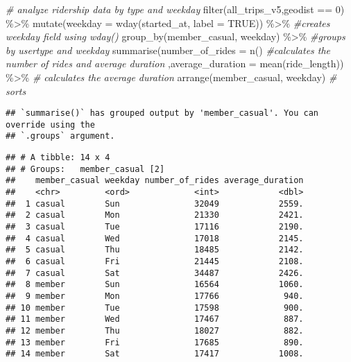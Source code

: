 \documentclass[
]{article}
\newenvironment{Shaded}{\begin{snugshade}}{\end{snugshade}}
\newcommand{\AttributeTok}[1]{\textcolor[rgb]{0.77,0.63,0.00}{#1}}
\newcommand{\CommentTok}[1]{\textcolor[rgb]{0.56,0.35,0.01}{\textit{#1}}}
\newcommand{\ConstantTok}[1]{\textcolor[rgb]{0.00,0.00,0.00}{#1}}
\newcommand{\DecValTok}[1]{\textcolor[rgb]{0.00,0.00,0.81}{#1}}
\newcommand{\FunctionTok}[1]{\textcolor[rgb]{0.00,0.00,0.00}{#1}}
\newcommand{\NormalTok}[1]{#1}
\newcommand{\SpecialCharTok}[1]{\textcolor[rgb]{0.00,0.00,0.00}{#1}}
\begin{document}
\begin{Shaded}
\begin{Highlighting}[]
\CommentTok{\# analyze ridership data by type and weekday}
\FunctionTok{filter}\NormalTok{(all\_trips\_v5,geodist }\SpecialCharTok{==} \DecValTok{0}\NormalTok{) }\SpecialCharTok{\%\textgreater{}\%} 
  \FunctionTok{mutate}\NormalTok{(}\AttributeTok{weekday =} \FunctionTok{wday}\NormalTok{(started\_at, }\AttributeTok{label =} \ConstantTok{TRUE}\NormalTok{)) }\SpecialCharTok{\%\textgreater{}\%}  \CommentTok{\#creates weekday field using wday()}
  \FunctionTok{group\_by}\NormalTok{(member\_casual, weekday) }\SpecialCharTok{\%\textgreater{}\%}  \CommentTok{\#groups by usertype and weekday}
  \FunctionTok{summarise}\NormalTok{(}\AttributeTok{number\_of\_rides =} \FunctionTok{n}\NormalTok{()                                                        }\CommentTok{\#calculates the number of rides and average duration }
\NormalTok{  ,}\AttributeTok{average\_duration =} \FunctionTok{mean}\NormalTok{(ride\_length)) }\SpecialCharTok{\%\textgreater{}\%}                 \CommentTok{\# calculates the average duration}
  \FunctionTok{arrange}\NormalTok{(member\_casual, weekday)                                                                }\CommentTok{\# sorts}
\end{Highlighting}
\end{Shaded}

\begin{verbatim}
## `summarise()` has grouped output by 'member_casual'. You can override using the
## `.groups` argument.
\end{verbatim}

\begin{verbatim}
## # A tibble: 14 x 4
## # Groups:   member_casual [2]
##    member_casual weekday number_of_rides average_duration
##    <chr>         <ord>             <int>            <dbl>
##  1 casual        Sun               32049            2559.
##  2 casual        Mon               21330            2421.
##  3 casual        Tue               17116            2190.
##  4 casual        Wed               17018            2145.
##  5 casual        Thu               18485            2142.
##  6 casual        Fri               21445            2108.
##  7 casual        Sat               34487            2426.
##  8 member        Sun               16564            1060.
##  9 member        Mon               17766             940.
## 10 member        Tue               17598             900.
## 11 member        Wed               17467             887.
## 12 member        Thu               18027             882.
## 13 member        Fri               17685             890.
## 14 member        Sat               17417            1008.
\end{verbatim}
\end{document}
